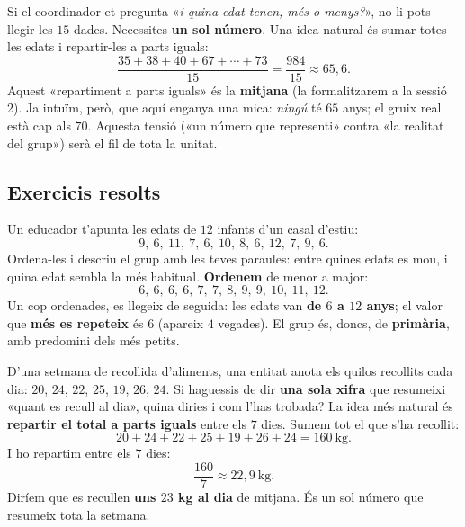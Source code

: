 \begin{exemple}
Si el coordinador et pregunta «\emph{i quina edat tenen, més o menys?}», no li pots
llegir les $15$ dades. Necessites \textbf{un sol número}. Una idea natural és sumar
totes les edats i repartir-les a parts iguals:
\[
\frac{35+38+40+67+\cdots+73}{15}=\frac{\num{984}}{15}\approx 65,6.
\]
Aquest «repartiment a parts iguals» és la \textbf{mitjana} (la formalitzarem a la
sessió 2). Ja intuïm, però, que aquí enganya una mica: \emph{ningú} té $65$ anys; el
gruix real està cap als $70$. Aquesta tensió («un número que representi» contra «la
realitat del grup») serà el fil de tota la unitat.
\end{exemple}

\subsection{Exercicis resolts}

\begin{exresolt}
Un educador t'apunta les edats de $12$ infants d'un casal d'estiu:
\[
9,\ 6,\ 11,\ 7,\ 6,\ 10,\ 8,\ 6,\ 12,\ 7,\ 9,\ 6.
\]
Ordena-les i descriu el grup amb les teves paraules: entre quines edats es mou, i
quina edat sembla la més habitual.
\solucio
\textbf{Ordenem} de menor a major:
\[
6,\ 6,\ 6,\ 6,\ 7,\ 7,\ 8,\ 9,\ 9,\ 10,\ 11,\ 12.
\]
Un cop ordenades, es llegeix de seguida: les edats van \textbf{de $6$ a $12$ anys};
el valor que \textbf{més es repeteix} és $6$ (apareix $4$ vegades). El grup és, doncs,
de \textbf{primària}, amb predomini dels més petits.
\end{exresolt}

\begin{exresolt}
D'una setmana de recollida d'aliments, una entitat anota els quilos recollits cada
dia: $20$, $24$, $22$, $25$, $19$, $26$, $24$. Si haguessis de dir \textbf{una sola
xifra} que resumeixi «quant es recull al dia», quina diries i com l'has trobada?
\solucio
La idea més natural és \textbf{repartir el total a parts iguals} entre els $7$ dies.
Sumem tot el que s'ha recollit:
\[
20+24+22+25+19+26+24=\num{160}\ \text{kg}.
\]
I ho repartim entre els $7$ dies:
\[
\frac{160}{7}\approx 22,9\ \text{kg}.
\]
Diríem que es recullen \textbf{uns $23$ kg al dia} de mitjana. És un sol número que
resumeix tota la setmana.
\end{exresolt}

